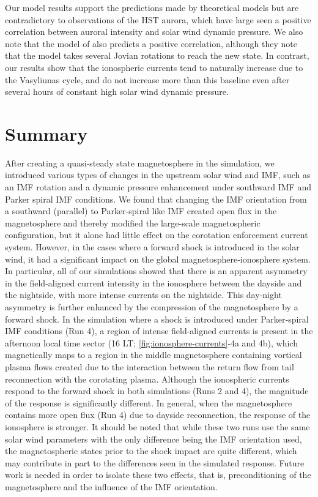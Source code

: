 Our model results support the predictions made by theoretical models \cite{Cowley2003a,Cowley2007,Southwood2001a} but are contradictory to observations of the HST aurora, which have large seen a positive correlation between auroral intensity and solar wind dynamic pressure. We also note that the model of \cite{Chane2013a} also predicts a positive correlation, although they note that the model takes several Jovian rotations to reach the new state. In contrast, our results show that the ionospheric currents tend to naturally increase due to the Vasyliunas cycle, and do not increase more than this baseline even after several hours of constant high solar wind dynamic pressure. 

\section{Summary}
After creating a quasi‐steady state magnetosphere in the simulation, we introduced various types of changes in the upstream solar wind and IMF, such as an IMF rotation and a dynamic pressure enhancement under southward IMF and Parker spiral IMF conditions. We found that changing the IMF orientation from a southward (parallel) to Parker‐spiral like IMF created open flux in the magnetosphere and thereby modified the large‐scale magnetospheric configuration, but it alone had little effect on the corotation enforcement current system. However, in the cases where a forward shock is introduced in the solar wind, it had a significant impact on the global magnetosphere‐ionosphere system. In particular, all of our simulations showed that there is an apparent asymmetry in the field‐aligned current intensity in the ionosphere between the dayside and the nightside, with more intense currents on the nightside. This day‐night asymmetry is further enhanced by the compression of the magnetosphere by a forward shock. In the simulation where a shock is introduced under Parker‐spiral IMF conditions (Run 4), a region of intense field‐aligned currents is present in the afternoon local time sector (16 LT; \ref{fig:ionosphere-currents}‐4a and 4b), which magnetically maps to a region in the middle magnetosphere containing vortical plasma flows created due to the interaction between the return flow from tail reconnection with the corotating plasma. Although the ionospheric currents respond to the forward shock in both simulations (Runs 2 and 4), the magnitude of the response is significantly different. In general, when the magnetosphere contains more open flux (Run 4) due to dayside reconnection, the response of the ionosphere is stronger. It should be noted that while these two runs use the same solar wind parameters with the only difference being the IMF orientation used, the magnetospheric states prior to the shock impact are quite different, which may contribute in part to the differences seen in the simulated response. Future work is needed in order to isolate these two effects, that is, preconditioning of the magnetosphere and the influence of the IMF orientation. 

